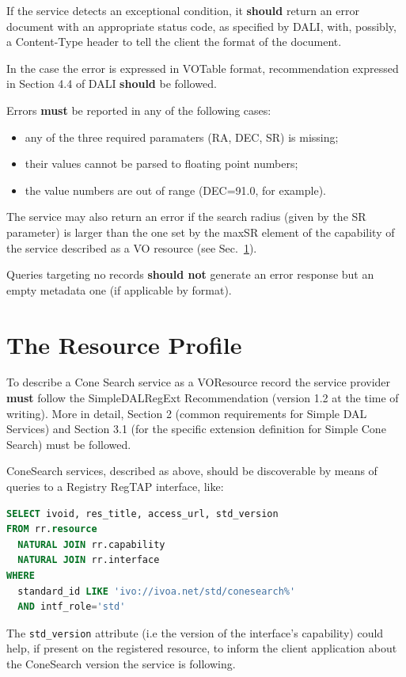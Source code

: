 \documentclass[11pt,a4paper]{ivoa}
\begin{document}
If the service detects an exceptional condition, it \textbf{should} return
an error document with an appropriate status code, as specified by DALI,
with, possibly, a Content-Type header to tell the client the format of
the document.

In the case the error is expressed in VOTable format, recommendation
expressed in Section 4.4 of DALI \textbf{should} be followed.

Errors \textbf{must} be reported in any of the following cases:
\begin{itemize}
	\item any of the three required paramaters (RA, DEC, SR) is missing;
	\item	their values cannot be parsed to floating point numbers;
	\item the value numbers are out of range (DEC=91.0, for example).
\end{itemize}

The service may also return an error if the search radius (given by the
SR parameter) is larger than the one set by the maxSR element of the
capability of the service described as a VO resource (see
Sec.~\ref{sec:3}).

Queries targeting no records \textbf{should not} generate an error
response but an empty metadata one (if applicable by format).

\section{The Resource Profile}
\label{sec:3} 

To describe a Cone Search service as a VOResource record the service
provider \textbf{must} follow the 
SimpleDALRegExt \citep{2022ivoa.spec.0222D} Recommendation (version 1.2
at the time of writing).
More in detail, Section 2 (common requirements for Simple DAL Services)
and Section 3.1 (for the specific extension definition for
Simple Cone Search) must be followed.

ConeSearch services, described as above, should be discoverable by means
of queries to a Registry RegTAP \citep{2024ivoa.spec.1002D} interface, like:
\begin{lstlisting}[language=SQL]
SELECT ivoid, res_title, access_url, std_version
FROM rr.resource
  NATURAL JOIN rr.capability
  NATURAL JOIN rr.interface 
WHERE
  standard_id LIKE 'ivo://ivoa.net/std/conesearch%'
  AND intf_role='std'
\end{lstlisting}

The \texttt{std\_version} attribute (i.e the version of the interface's
capability) could help, if present on the registered resource, to inform
the client application about the ConeSearch version the service is
following.
\end{document}
